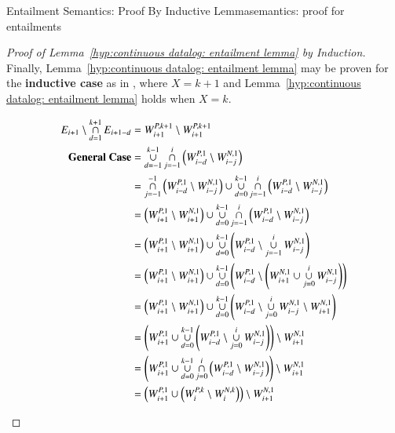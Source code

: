 \begin{nestedsection}{Entailment Semantics: Proof By Inductive Lemma}{semantics: proof for entailments}
\begin{proof}[Proof of Lemma~\ref{hyp:continuous datalog: entailment lemma} by Induction]
		Finally, Lemma~\ref{hyp:continuous datalog: entailment lemma} may be proven for the \textbf{inductive case} as in , where ${X = k + 1}$ and Lemma~\ref{hyp:continuous datalog: entailment lemma} holds when ${X = k}$.
		\begin{figure*}[p]
			\centering
			\caption[Proof of Entailment Lemma for Continuous Datalog]{Proof of Inductive Case of the Entailment Lemma for Continuous Datalog.}
			\begin{align*}
				E_{i+1} \setminus \mathop{\cap}^{k+1}_{d=1} E_{i+1-d} & = W^{P,k+1}_{i+1} \setminus W^{P,k+1}_{i+1} \\
				\text{\textbf{General Case}} & = \mathop{\cup}^{k-1}_{d=-1}\mathop{\cap}^{i}_{j=-1} \left( W^{P,1}_{i-d} \setminus W^{N,1}_{i-j} \right) \\
				& = \mathop{\cap}^{-1}_{j=-1} \left( W^{P,1}_{i-d} \setminus W^{N,1}_{i-j} \right) \cup \mathop{\cup}^{k-1}_{d=0}\mathop{\cap}^{i}_{j=-1} \left( W^{P,1}_{i-d} \setminus W^{N,1}_{i-j} \right) \\
				& = \left( W^{P,1}_{i+1} \setminus W^{N,1}_{i+1} \right) \cup \mathop{\cup}^{k-1}_{d=0}\mathop{\cap}^{i}_{j=-1} \left( W^{P,1}_{i-d} \setminus W^{N,1}_{i-j} \right) \\
				& = \left( W^{P,1}_{i+1} \setminus W^{N,1}_{i+1} \right) \cup \mathop{\cup}^{k-1}_{d=0} \left( W^{P,1}_{i-d} \setminus \mathop{\cup}^{i}_{j=-1} W^{N,1}_{i-j} \right) \\
				& = \left( W^{P,1}_{i+1} \setminus W^{N,1}_{i+1} \right) \cup \mathop{\cup}^{k-1}_{d=0} \left( W^{P,1}_{i-d} \setminus \left( W^{N,1}_{i+1} \cup \mathop{\cup}^{i}_{j=0} W^{N,1}_{i-j} \right) \right) \\
				& = \left( W^{P,1}_{i+1} \setminus W^{N,1}_{i+1} \right) \cup \mathop{\cup}^{k-1}_{d=0} \left( W^{P,1}_{i-d} \setminus \mathop{\cup}^{i}_{j=0} W^{N,1}_{i-j} \setminus W^{N,1}_{i+1} \right) \\
				& = \left( W^{P,1}_{i+1} \cup \mathop{\cup}^{k-1}_{d=0} \left( W^{P,1}_{i-d} \setminus \mathop{\cup}^{i}_{j=0} W^{N,1}_{i-j} \right) \right) \setminus W^{N,1}_{i+1} \\
				& = \left( W^{P,1}_{i+1} \cup \mathop{\cup}^{k-1}_{d=0}\mathop{\cap}^{i}_{j=0} \left( W^{P,1}_{i-d} \setminus W^{N,1}_{i-j} \right) \right) \setminus W^{N,1}_{i+1} \\
				& = \left( W^{P,1}_{i+1} \cup \left( W^{P,k}_{i} \setminus W^{N,k}_{i} \right) \right) \setminus W^{N,1}_{i+1} \\

\end{align*}
\end{figure*}
\end{proof}
\end{nestedsection}
